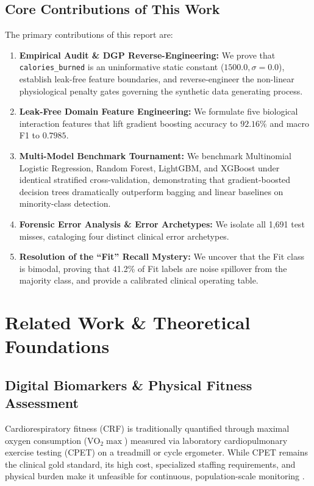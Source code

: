\documentclass[11pt,a4paper]{article}
\begin{document}
\subsection{Core Contributions of This Work}
The primary contributions of this report are:
\begin{enumerate}[leftmargin=*,itemsep=1pt]
    \item \textbf{Empirical Audit \& DGP Reverse-Engineering:} We prove that \texttt{calories\_burned} is an uninformative static constant ($1500.0, \sigma=0.0$), establish leak-free feature boundaries, and reverse-engineer the non-linear physiological penalty gates governing the synthetic data generating process.
    \item \textbf{Leak-Free Domain Feature Engineering:} We formulate five biological interaction features that lift gradient boosting accuracy to $\mathbf{92.16\%}$ and macro F1 to $\mathbf{0.7985}$.
    \item \textbf{Multi-Model Benchmark Tournament:} We benchmark Multinomial Logistic Regression, Random Forest, LightGBM, and XGBoost under identical stratified cross-validation, demonstrating that gradient-boosted decision trees dramatically outperform bagging and linear baselines on minority-class detection.
    \item \textbf{Forensic Error Analysis \& Error Archetypes:} We isolate all 1,691 test misses, cataloging four distinct clinical error archetypes.
    \item \textbf{Resolution of the ``Fit'' Recall Mystery:} We uncover that the Fit class is bimodal, proving that 41.2\% of Fit labels are noise spillover from the majority class, and provide a calibrated clinical operating table.
\end{enumerate}

\section{Related Work \& Theoretical Foundations}

\subsection{Digital Biomarkers \& Physical Fitness Assessment}
Cardiorespiratory fitness (CRF) is traditionally quantified through maximal oxygen consumption ($\text{VO}_2\max$) measured via laboratory cardiopulmonary exercise testing (CPET) on a treadmill or cycle ergometer. While CPET remains the clinical gold standard, its high cost, specialized staffing requirements, and physical burden make it unfeasible for continuous, population-scale monitoring \citep{ross2016}. 
\end{document}
